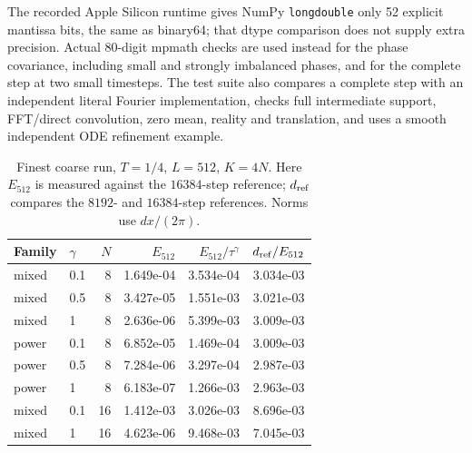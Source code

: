 \documentclass[11pt]{article}
\theoremstyle{remark}\newtheorem{remark}[theorem]{Remark}
\begin{document}
The recorded Apple Silicon runtime gives NumPy \texttt{longdouble}
only 52 explicit mantissa bits, the same as binary64; that dtype
comparison does not supply extra precision. Actual 80-digit mpmath
checks are used instead for the phase covariance, including small and
strongly imbalanced phases, and for the complete step at two small
timesteps. The test suite also compares a complete step with an
independent literal Fourier implementation, checks full intermediate
support, FFT/direct convolution, zero mean, reality and translation,
and uses a smooth independent ODE refinement example.

\begin{table}[tb]
\centering\small
\begin{tabular}{llrrrr}
\toprule
Family & $\gamma$ & $N$ & $E_{512}$ & $E_{512}/\tau^\gamma$ & $d_{\rm ref}/E_{512}$\\
\midrule
mixed & 0.1 & 8 & 1.649e-04 & 3.534e-04 & 3.034e-03 \\
mixed & 0.5 & 8 & 3.427e-05 & 1.551e-03 & 3.021e-03 \\
mixed & 1 & 8 & 2.636e-06 & 5.399e-03 & 3.009e-03 \\
power & 0.1 & 8 & 6.852e-05 & 1.469e-04 & 3.009e-03 \\
power & 0.5 & 8 & 7.284e-06 & 3.297e-04 & 2.987e-03 \\
power & 1 & 8 & 6.183e-07 & 1.266e-03 & 2.963e-03 \\
mixed & 0.1 & 16 & 1.412e-03 & 3.026e-03 & 8.696e-03 \\
mixed & 1 & 16 & 4.623e-06 & 9.468e-03 & 7.045e-03 \\
\bottomrule
\end{tabular}

\caption{Finest coarse run, $T=1/4$, $L=512$, $K=4N$.
Here $E_{512}$ is measured against the $16384$-step reference;
$d_{\rm ref}$ compares the $8192$- and $16384$-step references.
Norms use $dx/(2\pi)$.}\label{tab:global}
\end{table}
\end{document}

